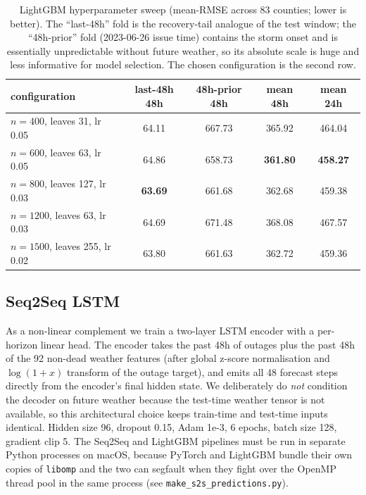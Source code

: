 \documentclass[11pt]{article}
\begin{document}
\begin{table}[h]
\centering
\begin{tabular}{lcccc}
\toprule
configuration & last-48h 48h & 48h-prior 48h & mean 48h & mean 24h \\
\midrule
$n{=}400$, leaves 31, lr 0.05     & 64.11 & 667.73 & 365.92 & 464.04 \\
$n{=}600$, leaves 63, lr 0.05     & 64.86 & 658.73 & \textbf{361.80} & \textbf{458.27} \\
$n{=}800$, leaves 127, lr 0.03    & \textbf{63.69} & 661.68 & 362.68 & 459.38 \\
$n{=}1200$, leaves 63, lr 0.03    & 64.69 & 671.48 & 368.08 & 467.57 \\
$n{=}1500$, leaves 255, lr 0.02   & 63.80 & 661.63 & 362.72 & 459.36 \\
\bottomrule
\end{tabular}
\caption{LightGBM hyperparameter sweep (mean-RMSE across 83 counties; lower
is better). The ``last-48h'' fold is the recovery-tail analogue of the
test window; the ``48h-prior'' fold (2023-06-26 issue time) contains the
storm onset and is essentially unpredictable without future weather, so
its absolute scale is huge and less informative for model selection. The
chosen configuration is the second row.\label{tab:lgbm_sweep}}
\end{table}

\subsection{Seq2Seq LSTM}

As a non-linear complement we train a two-layer LSTM encoder with a
per-horizon linear head. The encoder takes the past 48h of outages plus
the past 48h of the 92 non-dead weather features (after global z-score
normalisation and $\log(1+x)$ transform of the outage target), and emits
all 48 forecast steps directly from the encoder's final hidden state. We
deliberately do \emph{not} condition the decoder on future weather
because the test-time weather tensor is not available, so this
architectural choice keeps train-time and test-time inputs identical.
Hidden size 96, dropout 0.15, Adam 1e-3, 6 epochs, batch size 128,
gradient clip 5. The Seq2Seq and LightGBM pipelines must be run in
separate Python processes on macOS, because PyTorch and LightGBM bundle
their own copies of \texttt{libomp} and the two can segfault when they
fight over the OpenMP thread pool in the same process
(see \texttt{make\_s2s\_predictions.py}).
\end{document}
